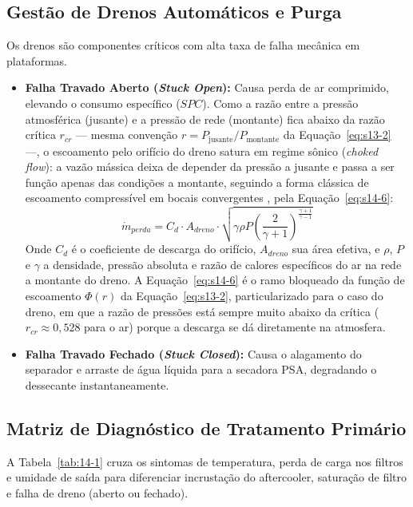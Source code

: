 \documentclass[12pt,a4paper]{article}
\numberwithin{equation}{section}
\numberwithin{table}{section}
\numberwithin{figure}{section}
\begin{document}
	\subsection{Gestão de Drenos Automáticos e Purga}
	Os drenos são componentes críticos com alta taxa de falha mecânica em plataformas.
	\begin{itemize}
		\item \textbf{Falha Travado Aberto (\textit{Stuck Open}):} Causa perda de ar comprimido, elevando o consumo específico ($SPC$). Como a razão entre a pressão atmosférica (jusante) e a pressão de rede (montante) fica abaixo da razão crítica $r_{cr}$ — mesma convenção $r=P_{\text{jusante}}/P_{\text{montante}}$ da Equação~\eqref{eq:s13-2} —, o escoamento pelo orifício do dreno satura em regime sônico (\textit{choked flow}): a vazão mássica deixa de depender da pressão a jusante e passa a ser função apenas das condições a montante, seguindo a forma clássica de escoamento compressível em bocais convergentes \cite{white}, pela Equação~\eqref{eq:s14-6}:
		\begin{equation}\label{eq:s14-6}
 \dot{m}_{perda} = C_d \cdot A_{dreno} \cdot \sqrt{\gamma \rho P \left( \frac{2}{\gamma+1} \right)^{\frac{\gamma+1}{\gamma-1}}}
\end{equation}
		Onde $C_d$ é o coeficiente de descarga do orifício, $A_{dreno}$ sua área efetiva, e $\rho$, $P$ e $\gamma$ a densidade, pressão absoluta e razão de calores específicos do ar na rede a montante do dreno. A Equação~\eqref{eq:s14-6} é o ramo bloqueado da função de escoamento $\Phi(r)$ da Equação~\eqref{eq:s13-2}, particularizado para o caso do dreno, em que a razão de pressões está sempre muito abaixo da crítica ($r_{cr} \approx 0{,}528$ para o ar) porque a descarga se dá diretamente na atmosfera.
		\item \textbf{Falha Travado Fechado (\textit{Stuck Closed}):} Causa o alagamento do separador e arraste de água líquida para a secadora PSA, degradando o dessecante instantaneamente.
	\end{itemize}
	
	\subsection{Matriz de Diagnóstico de Tratamento Primário}
	A Tabela~\ref{tab:14-1} cruza os sintomas de temperatura, perda de carga nos filtros e umidade de saída para diferenciar incrustação do aftercooler, saturação de filtro e falha de dreno (aberto ou fechado).
\end{document}
